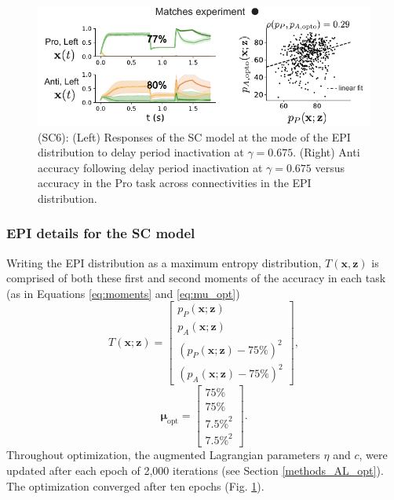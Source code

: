 \documentclass[11pt]{article}
\begin{document}
\begin{figure}
\begin{center}
\includegraphics[scale=1.2]{figures/figSC6/figSC6.pdf}
\end{center}
\caption{\small (SC6): 
(Left) Responses of the SC model at the mode of the EPI distribution to delay period inactivation at $\gamma = 0.675$.  (Right) Anti accuracy following delay period inactivation at $\gamma = 0.675$ versus accuracy in the Pro task across connectivities in the EPI distribution.
}
\label{fig:SC6}
\end{figure}

\subsubsection{EPI details for the SC model} \label{methods_sc_epi}
Writing the EPI distribution as a maximum entropy distribution, $T(\mathbf{x}, \mathbf{z})$ is comprised of both these first and second moments of the accuracy in each task (as in Equations \ref{eq:moments} and \ref{eq:mu_opt})
\begin{equation} 
T(\mathbf{x}; \mathbf{z}) = \begin{bmatrix} p_P(\mathbf{x}; \mathbf{z}) \\ p_A(\mathbf{x}; \mathbf{z}) \\ \left(p_P(\mathbf{x}; \mathbf{z}) - 75\% \right)^2 \\ \left(p_A(\mathbf{x}; \mathbf{z}) - 75\% \right)^2 \end{bmatrix},
\end{equation}
\begin{equation} 
\bm{\mu}_{\text{opt}} = \begin{bmatrix} 75\% \\ 75\% \\ 7.5\%^2 \\ 7.5\%^2 \end{bmatrix}.
\end{equation}
Throughout optimization, the augmented Lagrangian parameters $\eta$ and $c$, were updated after each epoch of 2,000 iterations (see Section \ref{methods_AL_opt}).  
The optimization converged after ten epochs (Fig. \ref{fig:SC6}).
\end{document}
